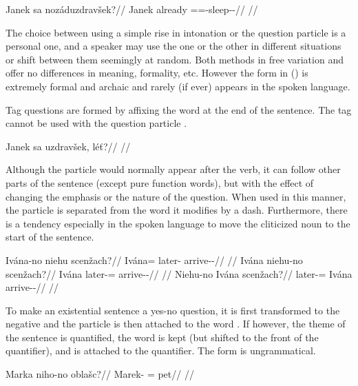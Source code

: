 \pex{}
\begingl
\gla Janek sa nozáduzdravšek?//
\glb Janek already \Q{}=\Neg{}=\Refl{}-sleep-\Av{}-\Pf{}//
\glft {}//
\endgl
\xe

The choice between using a simple rise in intonation or the question particle  is a personal one, and a speaker may use the one or the other in different situations or shift between them seemingly at random. Both methods in free variation and offer no differences in meaning, formality, etc. However the form in () is extremely formal and archaic and rarely (if ever) appears in the spoken language.

Tag questions are formed by affixing the word  at the end of the sentence. The tag cannot be used with the question particle .

\pex
\begingl
\gla Janek sa uzdravšek, l\'e\v{t}?//
\glft {}//
\endgl
\xe

Although the particle  would normally appear after the verb, it can follow other parts of the sentence (except pure function words), but with the effect of changing the emphasis or the nature of the question. When used in this manner, the particle is separated from the word it modifies by a dash. Furthermore, there is a tendency especially in the spoken language to move the cliticized noun to the start of the sentence.

\pex
\a
\begingl
\gla Ivána-no niehu scenžach?//
\glb Ivána=\Q{} later-\Ins{} arrive-\Av{}-\Ctp{}//
\glft {}//
\endgl
\a
\begingl
\gla Ivána niehu-no scenžach?//
\glb Ivána later-\Ins{}=\Q{} arrive-\Av{}-\Ctp{}//
\glft {}//
\endgl
\a
\begingl
\gla Niehu-no Ivána scenžach?//
\glb later-\Ins{}=\Q{} Ivána arrive-\Av{}-\Ctp{}//
\glft {}//
\endgl
\xe

To make an existential sentence a yes-no question, it is first transformed to the negative and the particle  is then attached to the word . If however, the theme of the sentence is quantified, the word  is kept (but shifted to the front of the quantifier), and  is attached to the quantifier. The form  is ungrammatical.

\pex
\begingl
\gla Marka niho-no oblašc?//
\glb Marek-\Pat{} \N{}\Exst{}=\Q{} pet//
\glft {}//
\endgl
\xe

